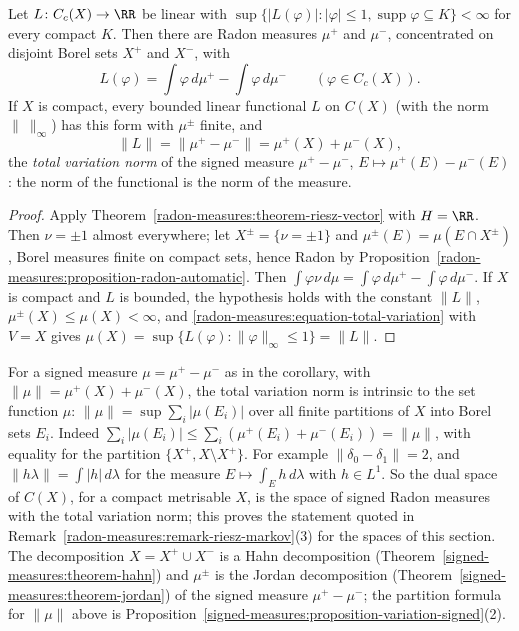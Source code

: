 \begin{corollary}\label{radon-measures:corollary-signed-riesz}
Let $L \colon C_c(X) \to \RR$ be linear with $\sup\{|L(\varphi)| : |\varphi| \leq 1, \operatorname{supp}\varphi \subseteq K\} < \infty$ for every compact $K$. Then there are Radon measures $\mu^+$ and
$\mu^-$, concentrated on disjoint Borel sets $X^+$ and $X^-$, with
\[
L(\varphi) = \int\varphi\,d\mu^+ - \int\varphi\,d\mu^- \qquad (\varphi \in C_c(X)).
\]
If $X$ is compact, every bounded linear functional $L$ on $C(X)$ (with the norm $\|\ \|_\infty$) has this form with $\mu^\pm$ finite, and
\[
\|L\| = \|\mu^+ - \mu^-\| = \mu^+(X) + \mu^-(X),
\]
the \emph{total variation norm} of the signed measure $\mu^+ - \mu^-$, $E \mapsto \mu^+(E) - \mu^-(E)$: the norm of the functional is the norm of the measure.
\end{corollary}

\begin{proof}
Apply Theorem~\ref{radon-measures:theorem-riesz-vector} with $H = \RR$. Then $\nu = \pm1$ almost everywhere; let $X^\pm = \{\nu = \pm1\}$ and $\mu^\pm(E) = \mu(E \cap X^\pm)$, Borel measures finite on compact
sets, hence Radon by Proposition~\ref{radon-measures:proposition-radon-automatic}. Then $\int\varphi\nu\,d\mu = \int\varphi\,d\mu^+ - \int\varphi\,d\mu^-$. If $X$ is compact and $L$ is bounded, the hypothesis
holds with the constant $\|L\|$, $\mu^\pm(X) \leq \mu(X) < \infty$, and \eqref{radon-measures:equation-total-variation} with $V = X$ gives $\mu(X) = \sup\{L(\varphi) : \|\varphi\|_\infty \leq 1\} = \|L\|$.
\end{proof}

For a signed measure $\mu = \mu^+ - \mu^-$ as in the corollary, with $\|\mu\| = \mu^+(X) + \mu^-(X)$, the total variation norm is intrinsic to the set function $\mu$:
$\|\mu\| = \sup\sum_i|\mu(E_i)|$ over all finite partitions of $X$ into Borel sets $E_i$. Indeed $\sum_i|\mu(E_i)| \leq \sum_i(\mu^+(E_i) + \mu^-(E_i)) = \|\mu\|$, with equality for the partition
$\{X^+, X \setminus X^+\}$. For example $\|\delta_0 - \delta_1\| = 2$, and $\|h\lambda\| = \int|h|\,d\lambda$ for the measure $E \mapsto \int_Eh\,d\lambda$ with $h \in L^1$.
So the dual space of $C(X)$, for a compact metrisable $X$, is the space of signed Radon measures with the total variation norm; this proves the statement quoted in
Remark~\ref{radon-measures:remark-riesz-markov}(3) for the spaces of this section. The decomposition $X = X^+ \cup X^-$ is a Hahn decomposition
(Theorem~\ref{signed-measures:theorem-hahn}) and $\mu^\pm$ is the Jordan decomposition (Theorem~\ref{signed-measures:theorem-jordan}) of the signed measure $\mu^+ - \mu^-$; the partition formula for
$\|\mu\|$ above is Proposition~\ref{signed-measures:proposition-variation-signed}(2).

